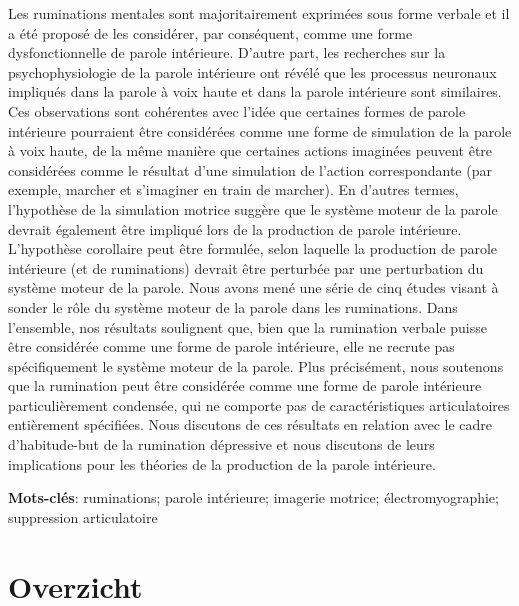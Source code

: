 \documentclass[a4paper,12pt,twoside,onecolumn,openright,final,oldfontcommands]{memoir}
\newcommand{\initial}[1]{
	\lettrine[lines=3,lhang=0.33,nindent=0em]{
		\color{gray}
     		{\textsc{#1}}}{}}
\newcommand\blankpage{%
    \null
    \thispagestyle{empty}%
    \newpage
    }
\begin{document}
\initial{L}es ruminations mentales sont majoritairement exprimées sous forme verbale et il a été proposé de les considérer, par conséquent, comme une forme dysfonctionnelle de parole intérieure. D'autre part, les recherches sur la psychophysiologie de la parole intérieure ont révélé que les processus neuronaux impliqués dans la parole à voix haute et dans la parole intérieure sont similaires. Ces observations sont cohérentes avec l'idée que certaines formes de parole intérieure pourraient être considérées comme une forme de simulation de la parole à voix haute, de la même manière que certaines actions imaginées peuvent être considérées comme le résultat d'une simulation de l'action correspondante (par exemple, marcher et s'imaginer en train de marcher). En d'autres termes, l'hypothèse de la simulation motrice suggère que le système moteur de la parole devrait également être impliqué lors de la production de parole intérieure. L'hypothèse corollaire peut être formulée, selon laquelle la production de parole intérieure (et de ruminations) devrait être perturbée par une perturbation du système moteur de la parole. Nous avons mené une série de cinq études visant à sonder le rôle du système moteur de la parole dans les ruminations. Dans l'ensemble, nos résultats soulignent que, bien que la rumination verbale puisse être considérée comme une forme de parole intérieure, elle ne recrute pas spécifiquement le système moteur de la parole. Plus précisément, nous soutenons que la rumination peut être considérée comme une forme de parole intérieure particulièrement condensée, qui ne comporte pas de caractéristiques articulatoires entièrement spécifiées. Nous discutons de ces résultats en relation avec le cadre d'habitude-but de la rumination dépressive et nous discutons de leurs implications pour les théories de la production de la parole intérieure.

\vspace{\baselineskip}

\textbf{Mots-clés}: ruminations; parole intérieure; imagerie motrice; électromyographie; suppression articulatoire

\afterpage{\blankpage}

\chapter*{Overzicht}
\end{document}
